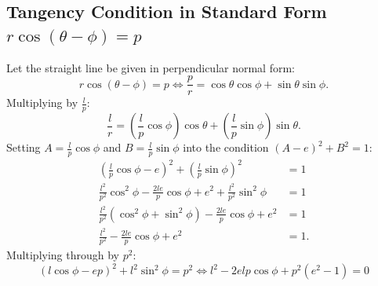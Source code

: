\subsection{Tangency Condition in Standard Form $r\cos(\theta - \phi) = p$}
Let the straight line be given in perpendicular normal form:
\begin{equation}
    r\cos(\theta - \phi) = p \iff \frac{p}{r} = \cos\theta\cos\phi + \sin\theta\sin\phi.
\end{equation}
Multiplying by $\frac{l}{p}$:
\begin{equation}
    \frac{l}{r} = \left(\frac{l}{p}\cos\phi\right)\cos\theta + \left(\frac{l}{p}\sin\phi\right)\sin\theta.
\end{equation}
Setting $A = \frac{l}{p}\cos\phi$ and $B = \frac{l}{p}\sin\phi$ into the condition $(A - e)^2 + B^2 = 1$:
\begin{align}
    \left(\frac{l}{p}\cos\phi - e\right)^2 + \left(\frac{l}{p}\sin\phi\right)^2 &= 1 \nonumber\\
    \frac{l^2}{p^2}\cos^2\phi - \frac{2le}{p}\cos\phi + e^2 + \frac{l^2}{p^2}\sin^2\phi &= 1 \nonumber\\
    \frac{l^2}{p^2}(\cos^2\phi + \sin^2\phi) - \frac{2le}{p}\cos\phi + e^2 &= 1 \nonumber\\
    \frac{l^2}{p^2} - \frac{2le}{p}\cos\phi + e^2 &= 1.
\end{align}
Multiplying through by $p^2$:
\begin{equation}
    \boxed{(l\cos\phi - ep)^2 + l^2\sin^2\phi = p^2 \iff l^2 - 2elp\cos\phi + p^2(e^2 - 1) = 0}
\end{equation}

